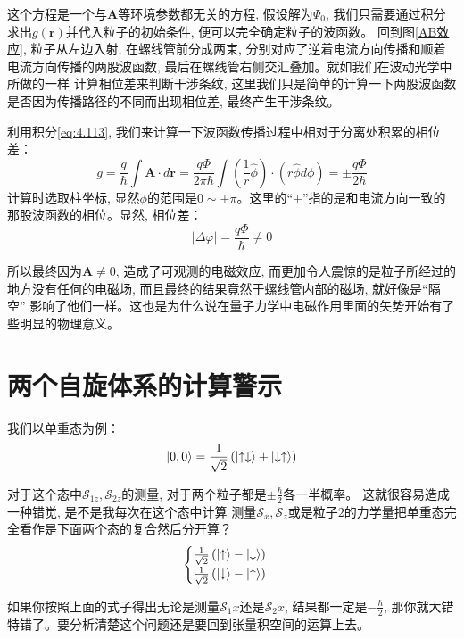 \documentclass[a4paper,zihao=-4,linespread=1]{ctexrep}
\begin{document}
    这个方程是一个与$\mathbf{A}$等环境参数都无关的方程, 假设解为$\Psi_0$, 我们只需要通过积分求出$g(\mathbf{r})$并代入粒子的初始条件, 便可以完全确定粒子的波函数。
    回到图\ref{AB效应}, 粒子从左边入射, 在螺线管前分成两束, 分别对应了逆着电流方向传播和顺着电流方向传播的两股波函数, 最后在螺线管右侧交汇叠加。就如我们在波动光学中所做的一样
    计算相位差来判断干涉条纹, 这里我们只是简单的计算一下两股波函数是否因为传播路径的不同而出现相位差, 最终产生干涉条纹。

    利用积分\ref{eq:4.113}, 我们来计算一下波函数传播过程中相对于分离处积累的相位差：
    \begin{equation}
        \label{eq:4.114}
        g=\frac{q}{\hbar} \int \mathbf{A} \cdot d \mathbf{r}=\frac{q \Phi}{2 \pi \hbar} \int\left(\frac{1}{r} \hat{\phi}\right) \cdot(r \hat{\phi} d \phi)=\pm \frac{q \Phi}{2 \hbar}
    \end{equation}
    计算时选取柱坐标, 显然$\phi$的范围是$0\sim\pm\pi$。这里的“$+$”指的是和电流方向一致的那股波函数的相位。显然, 相位差：
    \[|\Delta \varphi|=\frac{q\Phi}{\hbar}\neq 0\]
    
    所以最终因为$\mathbf{A}\neq 0$, 造成了可观测的电磁效应, 而更加令人震惊的是粒子所经过的地方没有任何的电磁场, 而且最终的结果竟然于螺线管内部的磁场, 就好像是“隔空”
    影响了他们一样。这也是为什么说在量子力学中电磁作用里面的矢势开始有了些明显的物理意义。

    \section{两个自旋体系的计算警示}
    我们以单重态为例：
    \[\ket{0,0}=\frac{1}{\sqrt{2}}\left(\ket{\uparrow\downarrow}+\ket{\downarrow\uparrow}\right)\]
    
    对于这个态中$\mathcal{S}_{1z}, \mathcal{S}_{2z}$的测量, 对于两个粒子都是$\pm\frac{\hbar}{2}$各一半概率。 这就很容易造成一种错觉, 是不是我每次在这个态中计算
    测量$\mathcal{S}_x,\mathcal{S}_z$或是粒子$2$的力学量把单重态完全看作是下面两个态的复合然后分开算？
    \begin{equation}
        \begin{cases}
            \frac{1}{\sqrt{2}}\left(\ket{\uparrow}-\ket{\downarrow}\right)\\
            \frac{1}{\sqrt{2}}\left(\ket{\downarrow}-\ket{\uparrow}\right)
        \end{cases}
    \end{equation}
    
    如果你按照上面的式子得出无论是测量$\mathcal{S}_1x$还是$\mathcal{S}_2x$, 结果都一定是$-\frac{\hbar}{2}$, 那你就大错特错了。要分析清楚这个问题还是要回到张量积空间的运算上去。
\end{document}
